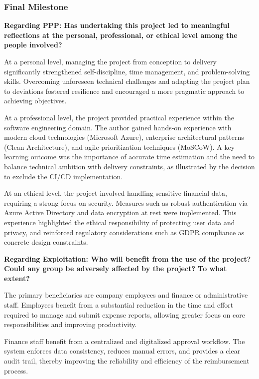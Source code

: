 \subsubsection{Final Milestone}

\textbf{Regarding PPP: Has undertaking this project led to meaningful reflections at the personal, professional, or ethical level among the people involved?}

At a personal level, managing the project from conception to delivery significantly strengthened self-discipline, time management, and problem-solving skills. Overcoming unforeseen technical challenges and adapting the project plan to deviations fostered resilience and encouraged a more pragmatic approach to achieving objectives.

At a professional level, the project provided practical experience within the software engineering domain. The author gained hands-on experience with modern cloud technologies (Microsoft Azure), enterprise architectural patterns (Clean Architecture), and agile prioritization techniques (MoSCoW). A key learning outcome was the importance of accurate time estimation and the need to balance technical ambition with delivery constraints, as illustrated by the decision to exclude the CI/CD implementation.

At an ethical level, the project involved handling sensitive financial data, requiring a strong focus on security. Measures such as robust authentication via Azure Active Directory and data encryption at rest were implemented. This experience highlighted the ethical responsibility of protecting user data and privacy, and reinforced regulatory considerations such as GDPR compliance as concrete design constraints.

\textbf{Regarding Exploitation: Who will benefit from the use of the project? Could any group be adversely affected by the project? To what extent?}

The primary beneficiaries are company employees and finance or administrative staff. Employees benefit from a substantial reduction in the time and effort required to manage and submit expense reports, allowing greater focus on core responsibilities and improving productivity.

Finance staff benefit from a centralized and digitalized approval workflow. The system enforces data consistency, reduces manual errors, and provides a clear audit trail, thereby improving the reliability and efficiency of the reimbursement process.

